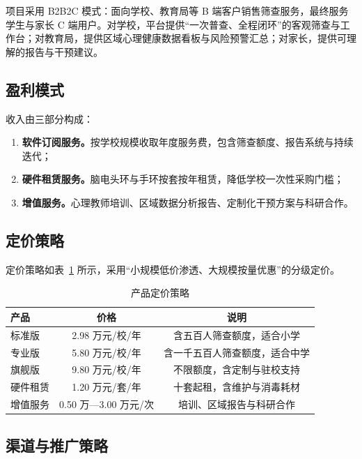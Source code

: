\documentclass[zihao=-4,fontset=windows,a4paper]{ctexart}
\begin{document}
项目采用 B2B2C 模式：面向学校、教育局等 B 端客户销售筛查服务，最终服务学生与家长 C 端用户。对学校，平台提供“一次普查、全程闭环”的客观筛查与工作台；对教育局，提供区域心理健康数据看板与风险预警汇总；对家长，提供可理解的报告与干预建议。

\subsection{盈利模式}

收入由三部分构成：

\begin{enumerate}
  \item \textbf{软件订阅服务。}按学校规模收取年度服务费，包含筛查额度、报告系统与持续迭代；
  \item \textbf{硬件租赁服务。}脑电头环与手环按套按年租赁，降低学校一次性采购门槛；
  \item \textbf{增值服务。}心理教师培训、区域数据分析报告、定制化干预方案与科研合作。
\end{enumerate}

\subsection{定价策略}

定价策略如表~\ref{tab:price} 所示，采用“小规模低价渗透、大规模按量优惠”的分级定价。

\begin{table}[H]
\centering
\caption{产品定价策略}
\label{tab:price}
\begin{tabular}{lcc}
\toprule
\textbf{产品} & \textbf{价格} & \textbf{说明} \\
\midrule
标准版 & 2.98 万元/校/年 & 含五百人筛查额度，适合小学 \\
专业版 & 5.80 万元/校/年 & 含一千五百人筛查额度，适合中学 \\
旗舰版 & 9.80 万元/校/年 & 不限额度，含定制与驻校支持 \\
硬件租赁 & 1.20 万元/套/年 & 十套起租，含维护与消毒耗材 \\
增值服务 & 0.50 万—3.00 万元/次 & 培训、区域报告与科研合作 \\
\bottomrule
\end{tabular}
\end{table}

\subsection{渠道与推广策略}
\end{document}
